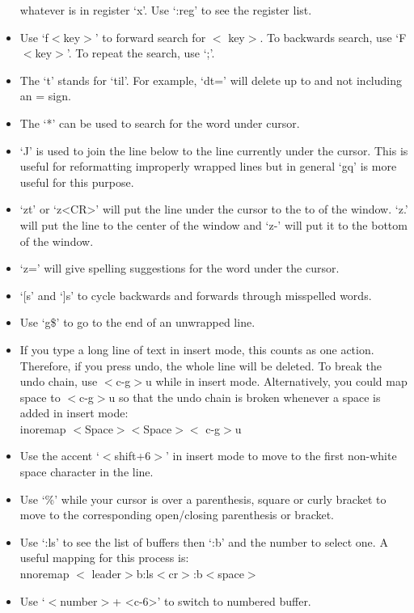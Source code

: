\documentclass[10pt]{article}
\newcommand{\tlangle}{$<$}
\newcommand{\trangle}{$>$}
\begin{document}
\begin{itemize}
        whatever is in register `x'.  Use `:reg' to see the register list.
    \item Use `f\tlangle key\trangle' to forward search for \tlangle
        key\trangle. To backwards search, use `F\tlangle key\trangle'. To repeat
        the search, use `;'.
    \item The `t' stands for `til'. For example, `dt=' will delete up to and not
        including an = sign.  \item The `*' can be used to search for the word
        under cursor.
    \item `J' is used to join the line below to the line currently under the
        cursor. This is useful for reformatting improperly wrapped lines but in
        general `gq' is more useful for this purpose.
    \item `zt' or `z<CR>' will put the line under the cursor to the to of the
        window. `z.' will put the line to the center of the window and `z-' will
        put it to the bottom of the window.
    \item `z=' will give spelling suggestions for the word under the cursor.
    \item `[s' and `]s' to cycle backwards and forwards through misspelled words.
    \item Use `g\$' to go to the end of an unwrapped line.
    \item If you type a long line of text in insert mode, this counts as one
        action. Therefore, if you press undo, the whole line will be deleted. To
        break the undo chain, use \tlangle c-g\trangle u while in insert mode.
        Alternatively, you could map space to \tlangle c-g\trangle u so that the
        undo chain is broken whenever a space is added in insert mode:\\
        inoremap \tlangle Space\trangle \tlangle Space\trangle \tlangle
        c-g\trangle u
    \item Use the accent `\tlangle shift+6\trangle' in insert mode to move to
        the first non-white space character in the line.
    \item Use `\%' while your cursor is over a parenthesis, square or curly
        bracket to move to the corresponding open/closing parenthesis or
        bracket.
    \item Use `:ls' to see the list of buffers then `:b' and the number to
        select one. A useful mapping for this process is:\\ nnoremap \tlangle
        leader\trangle b:ls\tlangle cr\trangle:b\tlangle space\trangle
    \item Use `\tlangle number\trangle + <c-6>' to switch to numbered buffer.
\end{itemize}
\end{document}

